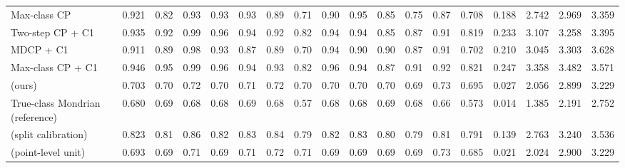 \begin{table}[!htbp]
{\begin{tabular}{lccccccccccccccccc}
Max-class CP & 0.921 & 0.82 & 0.93 & 0.93 & 0.93 & 0.89 & 0.71 & 0.90 & 0.95 & 0.85 & 0.75 & 0.87 & 0.708 & 0.188 & 2.742 & 2.969 & 3.359 \\
Two-step CP + C1 & 0.935 & 0.92 & 0.99 & 0.96 & 0.94 & 0.92 & 0.82 & 0.94 & 0.94 & 0.85 & 0.87 & 0.91 & 0.819 & 0.233 & 3.107 & 3.258 & 3.395 \\
MDCP + C1 & 0.911 & 0.89 & 0.98 & 0.93 & 0.87 & 0.89 & 0.70 & 0.94 & 0.90 & 0.90 & 0.87 & 0.91 & 0.702 & 0.210 & 3.045 & 3.303 & 3.628 \\
Max-class CP + C1 & 0.946 & 0.95 & 0.99 & 0.96 & 0.94 & 0.93 & 0.82 & 0.96 & 0.94 & 0.87 & 0.91 & 0.92 & 0.821 & 0.247 & 3.358 & 3.482 & 3.571 \\
\gamut{} (ours) & 0.703 & 0.70 & 0.72 & 0.70 & 0.71 & 0.72 & 0.70 & 0.70 & 0.70 & 0.70 & 0.69 & 0.73 & 0.695 & 0.027 & 2.056 & 2.899 & 3.229 \\
True-class Mondrian (reference) & 0.680 & 0.69 & 0.68 & 0.68 & 0.69 & 0.68 & 0.57 & 0.68 & 0.68 & 0.69 & 0.68 & 0.66 & 0.573 & 0.014 & 1.385 & 2.191 & 2.752 \\
\gamut{} (split calibration) & 0.823 & 0.81 & 0.86 & 0.82 & 0.83 & 0.84 & 0.79 & 0.82 & 0.83 & 0.80 & 0.79 & 0.81 & 0.791 & 0.139 & 2.763 & 3.240 & 3.536 \\
\gamut{} (point-level unit) & 0.693 & 0.69 & 0.71 & 0.69 & 0.71 & 0.72 & 0.71 & 0.69 & 0.69 & 0.69 & 0.69 & 0.73 & 0.685 & 0.021 & 2.024 & 2.900 & 3.229 \\
\bottomrule
\end{tabular}}
\end{table}
\FloatBarrier

